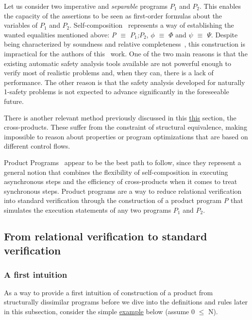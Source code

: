 Let us consider two imperative and \emph{separable} programs \emph{$P_1$} and \emph{$P_2$}.
This enables the capacity of the assertions to be seen as first-order formulas about the variables of \emph{$P_1$} and \emph{$P_2$}.
Self-composition~\cite{DBLP:conf/csfw/BartheDR04} represents a way of establishing the wanted equalities mentioned above: \emph{P $\equiv$ $P_1$;$P_2$}, \emph{$\phi$ $\equiv$ $\Phi$} and \emph{$\psi$ $\equiv$ $\Psi$}.
Despite being characterized by soundness and relative completeness~\cite{DBLP:journals/jlp/BartheCK16}, this construction is impractical for the authors of this~\cite{DBLP:conf/sas/TerauchiA05} work.
One of the two main reasons is that the existing automatic safety analysis tools available are not powerful enough to verify most of realistic problems and, when they can, there is a lack of performance.
The other reason is that the safety analysis developed for naturally 1-safety problems is not expected to advance significantly in the foreseeable future.

There is another relevant method previously discussed in this \hyperref[sec:cross_products]{this} section, the cross-products.
These suffer from the constraint of structural equivalence, making impossible to reason about properties or program optimizations that are based on different control flows.

Product Programs~\cite{DBLP:conf/fm/BartheCK11} appear to be the best path to follow, since they represent a general notion that combines the flexibility of self-composition in executing asynchronous steps and the efficiency of cross-products when it comes to treat synchronous steps. 
Product programs are a way to reduce relational verification into standard verification through the construction of a product program \emph{P} that simulates the execution statements of any two programs \emph{$P_1$} and \emph{$P_2$}.


\FloatBarrier
\subsection{From relational verification to standard verification} 
\label{subsec:product_programs_relverif_to_stdverif}

\subsubsection{A first intuition} 
\label{subsubsec:product_programs_intuition}

As a way to provide a first intuition of construction of a product from structurally dissimilar programs before we dive into the definitions and rules later in this subsection, consider the simple \hyperref[fig:pp_first_intuition]{example} below (assume 0 $\leq$ N).

